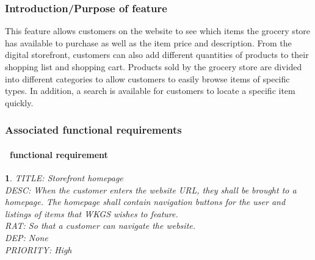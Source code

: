 \documentclass{scrreprt}
\theoremstyle{funreq}
\newtheorem{funreq}{}
\begin{document}
\subsubsection{Introduction/Purpose of feature}
This feature allows customers on the website to see which items the grocery store has available to purchase as well as the item price and description.  From the digital storefront, customers can also add different quantities of products to their shopping list and shopping cart.  Products sold by the grocery store are divided into different categories to allow customers to easily browse items of specific types.  In addition, a search is available for customers to locate a specific item quickly.
\subsubsection{Associated functional requirements}

\paragraph[]{\Subsectionname ~functional requirement }
\begin{funreq}
	\label{store_home}
	TITLE: Storefront homepage\\
	DESC: When the customer enters the website URL, they shall be brought to a homepage.  The homepage shall contain navigation buttons for the user and listings of items that WKGS wishes to feature.\\
	RAT: So that a customer can navigate the website.\\
	DEP: None\\
	PRIORITY: High\\
\end{funreq}
\end{document}
